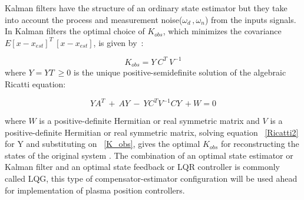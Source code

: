 Kalman filters have the structure of an ordinary state estimator but they take into account the process and measurement noise($\omega_d\,,\omega_n$) from the inputs signals. In Kalman filters the optimal choice of $K_{obs}$, which minimizes  the covariance $E{[x-x_{est}]^T~[x-x_{est}]}$, is given by~\cite[Chapter~9]{Skogestad}:  

\begin{equation}
K_{obs}=Y~C^T~V^{-1}
\label{K_obs}
\end{equation}
 where $Y=Y{ T}~ \geq 0$ is the unique positive-semidefinite solution of the algebraic Ricatti equation:
 
 
\begin{equation}
YA^T~+~AY~-~YC^TV^{-1}CY~+W=0
\label{Ricatti2}
\end{equation}

where $W$ is a positive-definite Hermitian or real symmetric matrix and $V$ is a positive-definite Hermitian or real symmetric matrix, solving equation ~\ref{Ricatti2} for Y and substituting on ~\ref{K_obs}, gives the optimal $K_{obs}$ for reconstructing the states of the original system . The combination of an optimal state estimator or Kalman filter  and an optimal state feedback or LQR controller is commonly called LQG, this type of compensator-estimator configuration will be used ahead for implementation of plasma position controllers. 